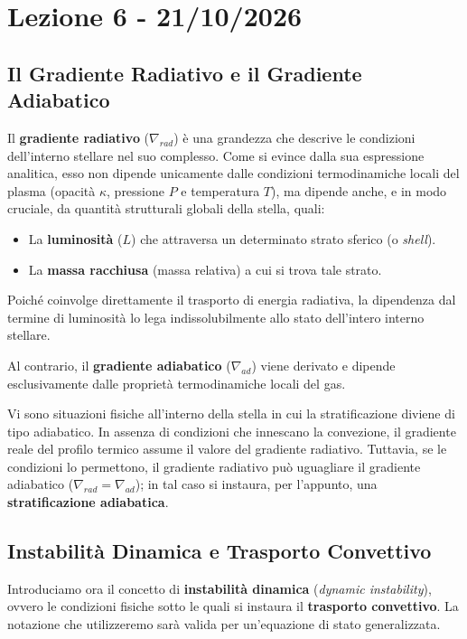 \chapter{Lezione 6 - 21/10/2026}

\section{Il Gradiente Radiativo e il Gradiente Adiabatico}

Il \textbf{gradiente radiativo} ($\nabla_{rad}$) è una grandezza che descrive le condizioni dell'interno stellare nel suo complesso. Come si evince dalla sua espressione analitica, esso non dipende unicamente dalle condizioni termodinamiche locali del plasma (opacità $\kappa$, pressione $P$ e temperatura $T$), ma dipende anche, e in modo cruciale, da quantità strutturali globali della stella, quali:
\begin{itemize}
\item La \textbf{luminosità} ($L$) che attraversa un determinato strato sferico (o \textit{shell}).
\item La \textbf{massa racchiusa} (massa relativa) a cui si trova tale strato.
\end{itemize}
Poiché coinvolge direttamente il trasporto di energia radiativa, la dipendenza dal termine di luminosità lo lega indissolubilmente allo stato dell'intero interno stellare.

Al contrario, il \textbf{gradiente adiabatico} ($\nabla_{ad}$) viene derivato e dipende esclusivamente dalle proprietà termodinamiche locali del gas.

Vi sono situazioni fisiche all'interno della stella in cui la stratificazione diviene di tipo adiabatico. In assenza di condizioni che innescano la convezione, il gradiente reale del profilo termico assume il valore del gradiente radiativo. Tuttavia, se le condizioni lo permettono, il gradiente radiativo può uguagliare il gradiente adiabatico ($\nabla_{rad} = \nabla_{ad}$); in tal caso si instaura, per l'appunto, una \textbf{stratificazione adiabatica}.

\section{Instabilità Dinamica e Trasporto Convettivo}

Introduciamo ora il concetto di \textbf{instabilità dinamica} (\textit{dynamic instability}), ovvero le condizioni fisiche sotto le quali si instaura il \textbf{trasporto convettivo}. La notazione che utilizzeremo sarà valida per un'equazione di stato generalizzata.

